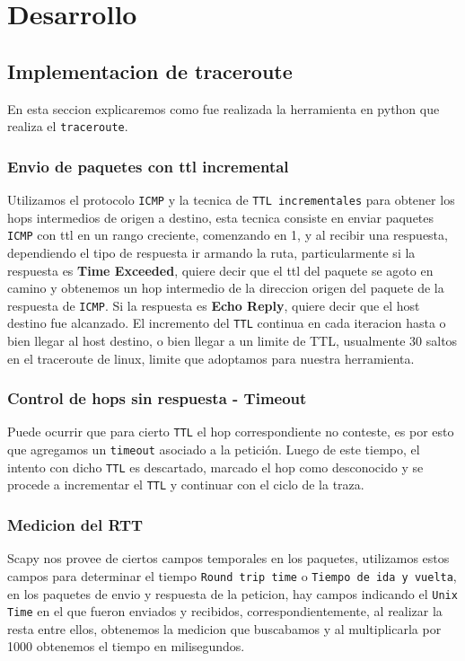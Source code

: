 \section{Desarrollo}
\subsection{Implementacion de traceroute}
En esta seccion explicaremos como fue realizada la herramienta en python que realiza el \texttt{traceroute}.
\subsubsection{Envio de paquetes con ttl incremental}
Utilizamos el protocolo \texttt{ICMP} y la tecnica de \texttt{TTL incrementales} para obtener los hops intermedios de origen a destino, esta tecnica consiste en enviar paquetes \texttt{ICMP} con ttl en un rango creciente, comenzando en 1, y al recibir una respuesta, dependiendo el tipo de respuesta ir armando la ruta, particularmente si la respuesta es \textbf{Time Exceeded}, quiere decir que el ttl del paquete se agoto en camino y obtenemos un hop intermedio de la direccion origen del paquete de la respuesta de \texttt{ICMP}. Si la respuesta es \textbf{Echo Reply}, quiere decir que el host destino fue alcanzado. El incremento del \texttt{TTL} continua en cada iteracion hasta o bien llegar al host destino, o bien llegar a un limite de TTL, usualmente 30 saltos en el traceroute de linux, limite que adoptamos para nuestra herramienta.
\subsubsection{Control de hops sin respuesta - Timeout}
Puede ocurrir que para cierto \texttt{TTL} el hop correspondiente no conteste, es por esto que agregamos un \texttt{timeout} asociado a la petici\'on. Luego de este tiempo, el intento con dicho \texttt{TTL} es descartado, marcado el hop como desconocido y se procede a incrementar el \texttt{TTL} y continuar con el ciclo de la traza.
\subsubsection{Medicion del RTT}
Scapy nos provee de ciertos campos temporales en los paquetes, utilizamos estos campos para determinar el tiempo \texttt{Round trip time} o \texttt{Tiempo de ida y vuelta}, en los paquetes de envio y respuesta de la peticion, hay campos indicando el \texttt{Unix Time} en el que fueron enviados y recibidos, correspondientemente, al realizar la resta entre ellos, obtenemos la medicion que buscabamos y al multiplicarla por 1000 obtenemos el tiempo en milisegundos.

